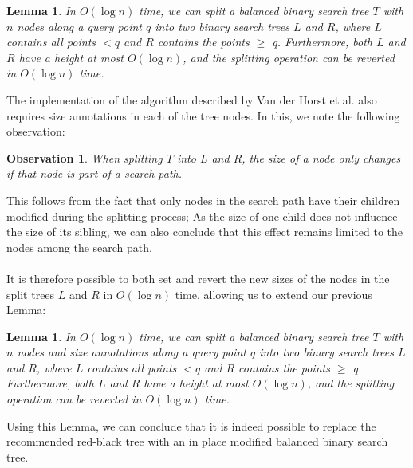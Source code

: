 \documentclass{article}
\newtheorem{lemma}[theorem]{Lemma}
\newtheorem{observation}{Observation}[theorem]
\begin{document}
\begin{lemma}
    In $O(\log n)$ time, we can split a balanced binary search tree $T$ with $n$ nodes along a query point $q$ into two binary search trees $L$ and $R$, where $L$ contains all points $<q$ and $R$ contains the points $\geq$ q. Furthermore, both $L$ and $R$ have a height at most $O(\log n)$, and the splitting operation can be reverted in $O(\log n)$ time.
\end{lemma}
The implementation of the algorithm described by Van der Horst et al. also requires size annotations in each of the tree nodes. In this, we note the following observation: 
\begin{observation}
When splitting $T$ into $L$ and $R$, the size of a node only changes if that node is part of a search path.
\end{observation}
This follows from the fact that only nodes in the search path have their children modified during the splitting process; As the size of one child does not influence the size of its sibling, we can also conclude that this effect remains limited to the nodes among the search path. \\\\
It is therefore possible to both set and revert the new sizes of the nodes in the split trees $L$ and $R$ in $O(\log n)$ time, allowing us to extend our previous Lemma:
\begin{lemma}
In $O(\log n)$ time, we can split a balanced binary search tree $T$ with $n$ nodes and size annotations along a query point $q$ into two binary search trees $L$ and $R$, where $L$ contains all points $<q$ and $R$ contains the points $\geq$ q. Furthermore, both $L$ and $R$ have a height at most $O(\log n)$, and the splitting operation can be reverted in $O(\log n)$ time.
\end{lemma}
Using this Lemma, we can conclude that it is indeed possible to replace the recommended red-black tree with an in place modified balanced binary search tree.
\end{document}
